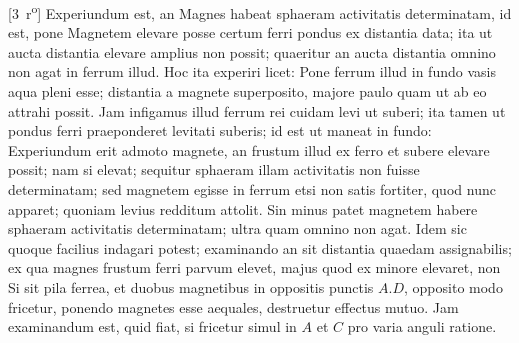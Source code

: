 \noindent%
[3~r\textsuperscript{o}] Experiundum est, an Magnes\protect{} habeat sphaeram activitatis\protect{} determinatam, id est, pone Magnetem elevare posse certum ferri\protect{} pondus\protect{} ex distantia data; ita ut aucta distantia elevare amplius non possit; quaeritur an aucta distantia omnino non agat in ferrum\protect{} illud. Hoc ita experiri licet: Pone ferrum\protect{} illud in fundo vasis\protect{} aqua\protect{} pleni esse; distantia a magnete\protect{} superposito, majore paulo quam ut ab eo attrahi possit. Jam infigamus illud ferrum\protect{} rei cuidam levi ut suberi\protect{}; ita tamen ut pondus\protect{} ferri\protect{} praeponderet levitati suberis\protect{}; id est ut maneat in fundo: Experiundum erit admoto magnete, an frustum illud ex ferro\protect{} et subere\protect{} elevare possit; nam si elevat; sequitur sphaeram illam activitatis\protect{} non fuisse determinatam; sed magnetem\protect{} egisse in ferrum\protect{} etsi non satis fortiter, quod nunc apparet; quoniam levius redditum attolit. Sin minus patet magnetem habere sphaeram activitatis\protect{} determinatam; ultra quam omnino non agat.
\pend
\pstart
Idem sic quoque facilius indagari potest; examinando an sit distantia quaedam assignabilis; ex qua magnes\protect{} frustum ferri\protect{} parvum elevet, majus quod ex minore elevaret, non  \pend
\newpage
\pstart
Si sit pila\protect{} ferrea, et duobus magnetibus\protect{} in oppositis punctis $\displaystyle A. D$, opposito modo fricetur, ponendo magnetes esse aequales, destruetur effectus mutuo. Jam examinandum est, quid fiat, si fricetur simul in $\displaystyle A$ et $\displaystyle C$ pro varia anguli ratione.
